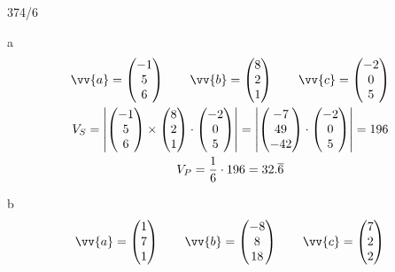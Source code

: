 \begin{exercise}{374/6}
  \item [a]
  \begin{gather*}
    \vv{a} = \begin{pmatrix}-1 \\ 5 \\ 6\end{pmatrix} \qquad \vv{b} = \begin{pmatrix}8 \\ 2 \\ 1\end{pmatrix} \qquad \vv{c} = \begin{pmatrix}-2 \\ 0 \\ 5\end{pmatrix} \\
    V_S = \left|\begin{pmatrix}-1 \\ 5 \\ 6\end{pmatrix} \times \begin{pmatrix}8 \\ 2 \\ 1\end{pmatrix} \cdot \begin{pmatrix}-2 \\ 0 \\ 5\end{pmatrix}\right| = \left|\begin{pmatrix}-7 \\ 49 \\ -42\end{pmatrix} \cdot \begin{pmatrix}-2 \\ 0 \\ 5\end{pmatrix}\right| = 196 \\
    V_P = \frac{1}{6} \cdot 196 = 32.\overline{6}
  \end{gather*}
  \item [b]
  \begin{gather*}
    \vv{a} = \begin{pmatrix}1 \\ 7 \\ 1\end{pmatrix} \qquad \vv{b} = \begin{pmatrix}-8 \\ 8 \\ 18\end{pmatrix} \qquad \vv{c} = \begin{pmatrix}7 \\ 2 \\ 2\end{pmatrix} \\

\end{gather*}
\end{exercise}
